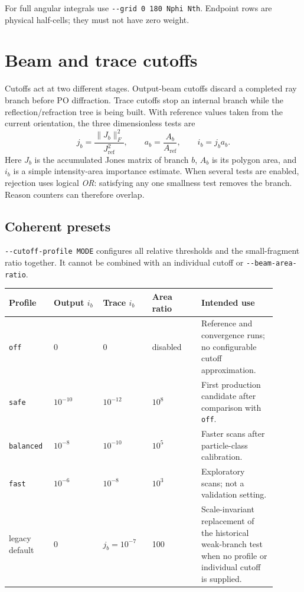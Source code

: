 \documentclass[
  10pt,
  a4paper,
]{article}
\begin{document}
For full angular integrals use \texttt{-\/-grid\ 0\ 180\ Nphi\ Nth}.
Endpoint rows are physical half-cells; they must not have zero weight.

\section{Beam and trace cutoffs}\label{beam-and-trace-cutoffs}

Cutoffs act at two different stages. Output-beam cutoffs discard a completed
ray branch before PO diffraction. Trace cutoffs stop an internal branch while
the reflection/refraction tree is being built. With reference values taken
from the current orientation, the three dimensionless tests are
\[
 j_b=\frac{\lVert J_b\rVert_F^2}{J_{\mathrm{ref}}^2},\qquad
 a_b=\frac{A_b}{A_{\mathrm{ref}}},\qquad
 i_b=j_ba_b.
\]
Here $J_b$ is the accumulated Jones matrix of branch $b$, $A_b$ is its
polygon area, and $i_b$ is a simple intensity-area importance estimate.
When several tests are enabled, rejection uses logical \emph{OR}: satisfying
any one smallness test removes the branch. Reason counters can therefore
overlap.

\subsection{Coherent presets}

\texttt{-\/-cutoff-profile MODE} configures all relative thresholds and the
small-fragment ratio together. It cannot be combined with an individual
cutoff or \texttt{-\/-beam-area-ratio}.

\begin{longtable}[]{@{}L{0.13\linewidth}L{0.17\linewidth}L{0.17\linewidth}L{0.17\linewidth}L{0.26\linewidth}@{}}
\toprule\noalign{}
Profile & Output $i_b$ & Trace $i_b$ & Area ratio & Intended use \\
\midrule\noalign{}
\endhead
\bottomrule\noalign{}
\endlastfoot
\texttt{off} & 0 & 0 & disabled & Reference and convergence runs; no
configurable cutoff approximation. \\
\texttt{safe} & $10^{-10}$ & $10^{-12}$ & $10^8$ & First production
candidate after comparison with \texttt{off}. \\
\texttt{balanced} & $10^{-8}$ & $10^{-10}$ & $10^5$ & Faster scans
after particle-class calibration. \\
\texttt{fast} & $10^{-6}$ & $10^{-8}$ & $10^3$ & Exploratory scans;
not a validation setting. \\
legacy default & 0 & $j_b=10^{-7}$ & 100 & Scale-invariant replacement of the historical weak-branch test when no profile
or individual cutoff is supplied. \\
\end{longtable}
\end{document}
